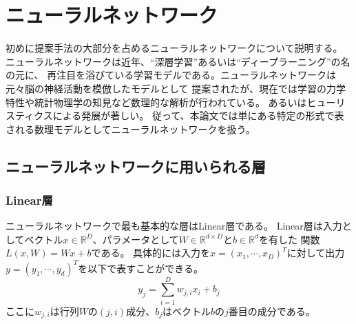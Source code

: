 

\section{\mc ニューラルネットワーク}
初めに提案手法の大部分を占めるニューラルネットワークについて説明する。
ニューラルネットワークは近年、``深層学習''あるいは``ディープラーニング''の名の元に、
再注目を浴びている学習モデルである。ニューラルネットワークは元々脳の神経活動を模倣したモデルとして
提案されたが、現在では学習の力学特性や統計物理学の知見など数理的な解析が行われている\cite{ディープローカルミニマム,DeepvsShallow}。
あるいはヒューリスティクスによる発展が著しい。
従って、本論文では単にある特定の形式で表される数理モデルとしてニューラルネットワークを扱う。


\subsection{\mc ニューラルネットワークに用いられる層}
\subsubsection{\rm Linear\mc 層}
ニューラルネットワークで最も基本的な層はLinear層である。
Linear層は入力としてベクトル\(x \in \mathbb R^D\)、パラメータとして\(W \in \mathbb R^{d\times D}\)と\(b \in \mathbb R^d\)を有した
関数\(L(x,W) = Wx + b\)である。
具体的には入力を\(x=(x_1,\cdots,x_D)^T\)に対して出力\(y=(y_1,\cdots,y_d)^T\)を以下で表すことができる。
\begin{equation}
    y_j = \sum_{i=1}^D  w_{j,i}x_i + b_j 
\end{equation}
ここに\(w_{j,i}\)は行列\(W\)の\((j,i)\)成分、\(b_j\)はベクトル\(b\)の\(j\)番目の成分である。

